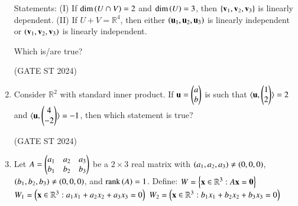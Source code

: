 \documentclass[journal,12pt,onecolumn]{IEEEtran}
\theoremstyle{remark}
\begin{document}
\begin{enumerate}
Statements:  
(I) If $\dim\left(U \cap V\right) = 2$ and $\dim\left(U\right) = 3$, then $\left\{\mathbf{v}_1, \mathbf{v}_2, \mathbf{v}_3\right\}$ is linearly dependent.  
(II) If $U + V = \mathbb{R}^4$, then either $\left(\mathbf{u}_1, \mathbf{u}_2, \mathbf{u}_3\right)$ is linearly independent or $\left(\mathbf{v}_1, \mathbf{v}_2, \mathbf{v}_3\right)$ is linearly independent.

Which is/are true?

\begin{enumerate}
\end{enumerate}
\hfill (GATE ST 2024)
\item 
Consider $\mathbb{R}^2$ with standard inner product. If $\mathbf{u} = \begin{pmatrix} a \\ b \end{pmatrix}$ is such that  
$\langle \mathbf{u}, \begin{pmatrix} 1 \\ 2 \end{pmatrix} \rangle = 2$  
and  
$\langle \mathbf{u}, \begin{pmatrix} 4 \\ -2 \end{pmatrix} \rangle = -1$,  
then which statement is true?

\begin{enumerate}
\end{enumerate}
\hfill (GATE ST 2024)
\item 
Let $A = \begin{pmatrix} a_1 & a_2 & a_3 \\ b_1 & b_2 & b_3 \end{pmatrix}$ be a $2\times 3$ real matrix with $\left(a_1,a_2,a_3\right) \neq \left(0,0,0\right)$, $\left(b_1,b_2,b_3\right) \neq \left(0,0,0\right)$, and $\mathrm{rank}\left(A\right) = 1$.  
Define:  
$W = \left\{ \mathbf{x} \in \mathbb{R}^3 : A\mathbf{x} = \mathbf{0} \right\}$  
$W_1 = \left( \mathbf{x} \in \mathbb{R}^3 : a_1 x_1 + a_2 x_2 + a_3 x_3 = 0\right)$ 
$W_2 = \left(\mathbf{x} \in \mathbb{R}^3 : b_1 x_1 + b_2 x_2 + b_3 x_3 = 0\right)$


\end{enumerate}
\end{document}
